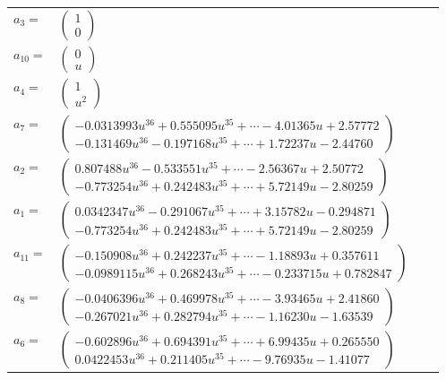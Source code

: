\documentclass[1p]{elsarticle_modified}
\theoremstyle{definition}
\begin{document}
\begin{tabular}{m{7pt} m{180pt} m{7pt} m{180pt} }
\flushright $a_{3}=$&$\begin{pmatrix}1\\0\end{pmatrix}$ \\
\flushright $a_{10}=$&$\begin{pmatrix}0\\u\end{pmatrix}$ \\
\flushright $a_{4}=$&$\begin{pmatrix}1\\u^2\end{pmatrix}$ \\
\flushright $a_{7}=$&$\begin{pmatrix}-0.0313993 u^{36}+0.555095 u^{35}+\cdots-4.01365 u+2.57772\\-0.131469 u^{36}-0.197168 u^{35}+\cdots+1.72237 u-2.44760\end{pmatrix}$ \\
\flushright $a_{2}=$&$\begin{pmatrix}0.807488 u^{36}-0.533551 u^{35}+\cdots-2.56367 u+2.50772\\-0.773254 u^{36}+0.242483 u^{35}+\cdots+5.72149 u-2.80259\end{pmatrix}$ \\
\flushright $a_{1}=$&$\begin{pmatrix}0.0342347 u^{36}-0.291067 u^{35}+\cdots+3.15782 u-0.294871\\-0.773254 u^{36}+0.242483 u^{35}+\cdots+5.72149 u-2.80259\end{pmatrix}$ \\
\flushright $a_{11}=$&$\begin{pmatrix}-0.150908 u^{36}+0.242237 u^{35}+\cdots-1.18893 u+0.357611\\-0.0989115 u^{36}+0.268243 u^{35}+\cdots-0.233715 u+0.782847\end{pmatrix}$ \\
\flushright $a_{8}=$&$\begin{pmatrix}-0.0406396 u^{36}+0.469978 u^{35}+\cdots-3.93465 u+2.41860\\-0.267021 u^{36}+0.282794 u^{35}+\cdots-1.16230 u-1.63539\end{pmatrix}$ \\
\flushright $a_{6}=$&$\begin{pmatrix}-0.602896 u^{36}+0.694391 u^{35}+\cdots+6.99435 u+0.265550\\0.0422453 u^{36}+0.211405 u^{35}+\cdots-9.76935 u-1.41077\end{pmatrix}$ \\

\end{tabular}
\end{document}
